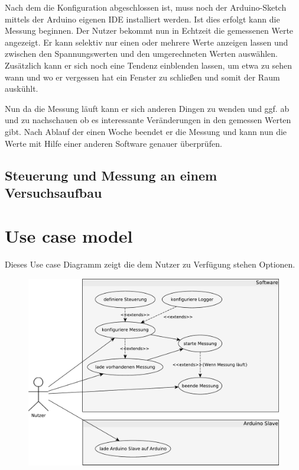Nach dem die Konfiguration abgeschlossen ist, muss noch der Arduino-Sketch mittels der Arduino eigenen IDE installiert werden. Ist dies erfolgt kann die Messung beginnen. Der Nutzer bekommt nun in Echtzeit die gemessenen Werte angezeigt. Er kann selektiv nur einen oder mehrere Werte anzeigen lassen und zwischen den Spannungswerten und den umgerechneten Werten auswählen. Zusätzlich kann er sich noch eine Tendenz einblenden lassen, um etwa zu sehen wann und wo er vergessen hat ein Fenster zu schließen und somit der Raum auskühlt. 

Nun da die Messung läuft kann er sich anderen Dingen zu wenden und ggf. ab und zu nachschauen ob es interessante Veränderungen in den gemessen Werten gibt.
Nach Ablauf der einen Woche beendet er die Messung und kann nun die Werte mit Hilfe einer anderen Software genauer überprüfen.
\subsection{Steuerung und Messung an einem Versuchsaufbau}
\section{Use case model}
Dieses Use case Diagramm zeigt die dem Nutzer zu Verfügung stehen Optionen.
\begin{figure}[H]
 \centering
 \includegraphics[width=\textwidth, keepaspectratio=true]{../Diagramme/BachelorUseCase1.pdf}
\end{figure}

